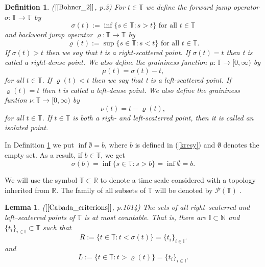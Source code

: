 \documentclass[12pt,a4paper,oneside,titlepage]{article}
\newtheorem{Def}{Definition}
\newtheorem{Lemat}{Lemma}
\begin{document}
\begin{Def} ($[\ref{Bohner_2}]$, p.3)
\label{jump_operatora}
For $t \in \mathbb{T}$ we define the forward jump operator $\sigma: \mathbb{T} \rightarrow \mathbb{T}$ by
\begin{equation}
\nonumber
\sigma(t):= \inf \lbrace s \in \mathbb{T}: s>t \rbrace \text{ for all } t \in \mathbb{T}
\end{equation}
and backward jump operator $\varrho: \mathbb{T} \rightarrow \mathbb{T}$ by
\begin{equation}
\nonumber
\varrho(t):= \sup \lbrace s \in \mathbb{T}: s<t \rbrace \text{ for all } t \in \mathbb{T}.
\end{equation}
If $\sigma(t)>t$ then we say that t is a right-scattered point. If $\sigma(t)=t$ then t is called a right-dense point. We also define the graininess function $\mu: \mathbb{T} \rightarrow [0, \infty)$ by
\begin{equation}
\nonumber
\mu(t)= \sigma(t) -t,
\end{equation}
for all $t \in \mathbb{T}$. If $\varrho(t)<t$ then we say that t is a left-scattered point. If $\varrho(t)=t$ then t is called a left-dense point. We also define the graininess funtion $\nu: \mathbb{T} \rightarrow [0, \infty)$ by
\begin{equation}
\nonumber
\nu(t)= t - \varrho(t),
\end{equation}
for all  $t \in \mathbb{T}$. If $t \in \mathbb{T}$ is both a righ- and left-scaterred point, then it is called an isolated point.
\end{Def}
In Definition \ref{jump_operatora} we put   $\inf \emptyset =b$, where $b$ is  defined in (\ref{kresy}) and $\emptyset$ denotes the empty set.
 As a result, if $b \in \mathbb{T}$, we get
\begin{equation}
\nonumber
\sigma(b)= \inf \lbrace s \in \mathbb{T}: s> b \rbrace = \inf \emptyset =b.
\end{equation}

We will use the symbol $\mathbb{T} \subset \mathbb{R}$ to denote a time-scale considered with a topology inherited from $\mathbb{R}$. The family of all subsets of $\mathbb{T}$ will be denoted  by $\mathcal{P}(\mathbb{T})$ .
\begin{Lemat} ($[\ref{Cabada_criterions}]$, p.1014) 
The sets of all right--scaterred and left--scaterred points of $\mathbb{T}$ is at most countable. That is, there are $\mathbb{I} \subset \mathbb{N}$ and $\lbrace t_i \rbrace_{i \in \mathbb{I}} \subset \mathbb{T}$ such that
\begin{equation}
\label{11}
R:= \lbrace t \in \mathbb{T} : t < \sigma(t) \rbrace = \lbrace t_i \rbrace_{i \in \mathbb{I}}.
\end{equation}
and
\begin{equation}
\label{11L}
L:= \lbrace t \in \mathbb{T} : t > \varrho(t) \rbrace = \lbrace t_i \rbrace_{i \in \mathbb{I}}.
\end{equation}
\end{Lemat}
\end{document}

